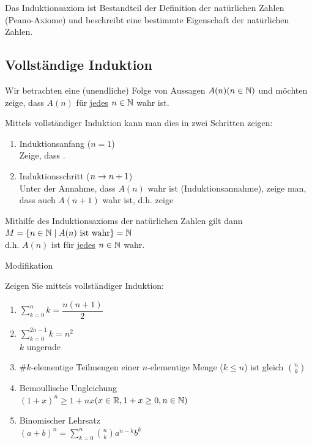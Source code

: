 \Bem Das Induktionsaxiom ist Bestandteil der Definition der natürlichen Zahlen (Peano-Axiome) und beschreibt eine bestimmte Eigenschaft der natürlichen Zahlen.

\subsection{Vollständige Induktion}

Wir betrachten eine (unendliche) Folge von Aussagen $A(n) (n\in\mathbb{N})$ und möchten zeige, dass $A(n)$ für \ul{jedes} $n\in\mathbb{N}$ wahr ist.

Mittels vollständiger Induktion kann man dies in zwei Schritten zeigen:

\begin{enumerate}
	\item Induktionsanfang ($n=1$)\\
	Zeige, dass .
	\item Induktionsschritt ($n\rightarrow n+1$)\\
	Unter der Annahme, dass $A(n)$ wahr ist (Induktionsannahme), zeige man, dass auch $A(n+1)$ wahr ist, d.h. zeige 
\end{enumerate}

Mithilfe des Induktionsaxioms der natürlichen Zahlen gilt dann\\
$M=\{n\in\mathbb{N}\mid A(n)\text{ ist wahr}\} = \mathbb{N}$\\
d.h. $A(n)$ ist für \ul{jedes} $n\in\mathbb{N}$ wahr.

\Bem Modifikation


\Bsp Zeigen Sie mittels vollständiger Induktion:
\begin{enumerate}
	\item\label{a1} $\sum\limits_{k=0}^{n}k = \dfrac{n(n+1)}{2}$
	\item\label{a2} $\sum\limits_{k=0}^{2n-1}k = n^2$\\
	$k$ ungerade
	
	\item $\#k$-elementige Teilmengen einer $n$-elementige Menge ($k \le n$) ist gleich $\binom{n}{k}$
	
	\item Bemoullische Ungleichung\\
	$(1+x)^n \ge 1+nx$\qquad$(x\in\mathbb{R}, 1+x\ge 0, n\in\mathbb{N})$
	
	\item Binomischer Lehrsatz\\
	$(a+b)^n = \sum\limits_{k=0}^{n}\binom{n}{k} a^{n-k}b^k$
\end{enumerate}

